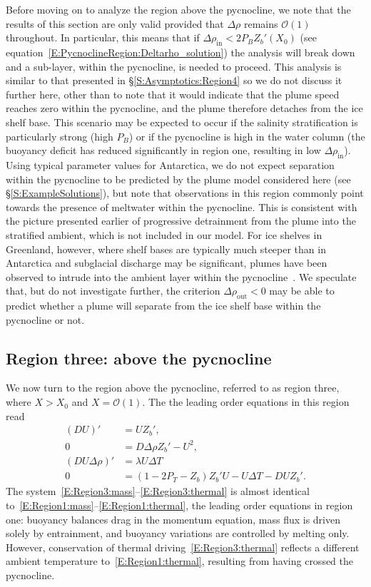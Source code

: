 \documentclass[openacc]{rsproca_new}%
\newcommand{\order}[1]{\mathcal{O}(#1)}
\newcommand{\Pb}{\textit{P}_B}  %
\newcommand{\Pt}{\textit{P}_T}
\renewcommand{\in}{\text{in}} %
\newcommand{\out}{\text{out}}
\begin{document}
Before moving on to analyze the  region above the pycnocline, we note that the results of this section are only valid provided that $\Delta \rho$ remains $\order{1}$ throughout. In particular, this means that if $\Delta \rho_{\in} < 2 \Pb Z_b'(X_0)$ (see equation~\eqref{E:PycnoclineRegion:Deltarho_solution}) the analysis will break down and a sub-layer, within the pycnocline, is needed to proceed. This analysis is similar to that presented in \S\ref{S:Asymptotics:Region4} so we do not discuss it further here, other than to note that it would indicate that the plume speed reaches zero within the pycnocline, and the plume therefore detaches from the ice shelf base. This scenario may be expected to occur if the salinity stratification is particularly strong (high $\Pb$) or if the pycnocline is high in the water column (the buoyancy deficit has reduced significantly in region one, resulting in low $\Delta \rho_{\in}$). Using typical parameter values for Antarctica, we do not expect separation within the pycnocline to be predicted by the plume model considered here (see \S\ref{S:ExampleSolutions}), but note that observations in this region commonly point towards the presence of meltwater within the pycnocline. This is consistent with the picture presented earlier of progressive detrainment from the plume into the stratified ambient, which is not included in our model. For ice shelves in Greenland, however, where shelf bases are typically much steeper than in Antarctica and subglacial discharge may be significant, plumes have been observed to intrude into the ambient layer within the pycnocline~\citep{Straneo2011NatureGeo}. We speculate that, but do not investigate further, the criterion $\Delta \rho_\out < 0$  may be able to predict whether a plume will separate from the ice shelf base within the pycnocline or not.

\subsection{Region three: above the pycnocline}\label{S:Asymptotics:Region3}
We now turn to the region above the pycnocline, referred to as region three, where $X > X_0$ and $X = \order{1}$. The the leading order equations in this region read
\begin{align}
 (DU)' &= U Z_b',\label{E:Region3:mass}\\
0 &= D \Delta \rho Z_b' - U^2, \label{E:Region3:mom}\\
(DU\Delta \rho)'  &=\lambda U \Delta T\label{E:Region3:buoyancy}\\
0&= (1  - 2\Pt -  Z_b)Z_b'U- U\Delta T - DU Z_b'.\label{E:Region3:thermal}
\end{align}
The system~\eqref{E:Region3:mass}--\eqref{E:Region3:thermal} is almost identical to~\eqref{E:Region1:mass}--\eqref{E:Region1:thermal}, the leading order equations in region one: buoyancy balances drag in the momentum equation, mass flux is driven solely by entrainment, and buoyancy variations are controlled by melting only. However, conservation of thermal driving~\eqref{E:Region3:thermal} reflects a different ambient temperature to~\eqref{E:Region1:thermal}, resulting from having crossed the pycnocline.
\end{document}
